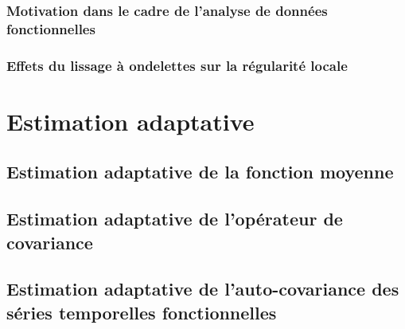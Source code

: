 \subsubsection{Motivation dans le cadre de l'analyse de données fonctionnelles}

\subsubsection{Effets du lissage à ondelettes sur la régularité locale}

\section{Estimation adaptative}

\subsection{Estimation adaptative de la fonction moyenne}

\subsection{Estimation adaptative de l'opérateur de covariance}

\subsection{Estimation adaptative de l'auto-covariance des séries temporelles fonctionnelles}